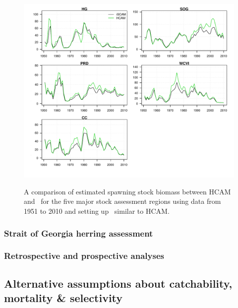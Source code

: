 \begin{figure}[htbp]
	\centering
		\includegraphics[width=\textwidth]{../Figs/iscam_fig_SBt_iSCAMvsHCAM.pdf}\\
	\caption{A comparison of estimated spawning stock biomass between HCAM and \iscam\ for the five major stock assessment regions using data from 1951 to 2010 and setting up \iscam\ similar to HCAM.}
	\label{fig:iSCAMvsHCAM}
\end{figure}



		\subsubsection{Strait of Georgia herring assessment}
		\subsubsection{Retrospective and prospective analyses}
	\subsection{Alternative assumptions about catchability, mortality \& selectivity}
